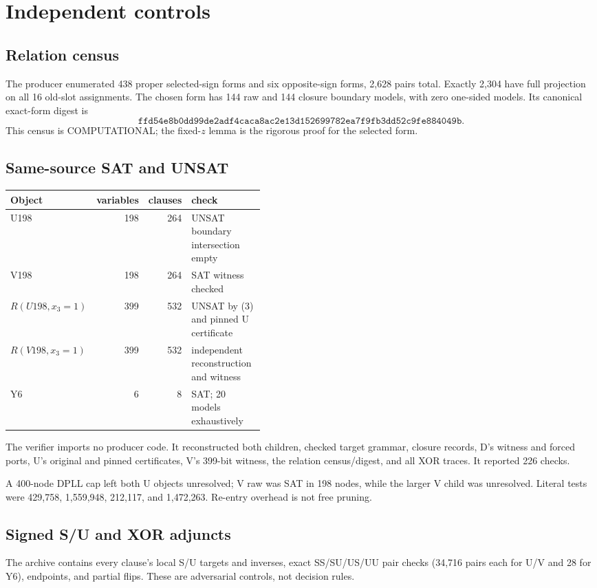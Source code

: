 \documentclass[11pt]{article}
\newcommand{\status}[1]{\textsf{#1}}
\begin{document}
\section{Independent controls}

\subsection{Relation census}
The producer enumerated 438 proper selected-sign forms and six opposite-sign forms, 2,628 pairs total.  Exactly 2,304 have full projection on all 16 old-slot assignments.  The chosen form has 144 raw and 144 closure boundary models, with zero one-sided models.  Its canonical exact-form digest is
\[
\texttt{ffd54e8b0dd99de2adf4caca8ac2e13d152699782ea7f9fb3dd52c9fe884049b}.
\]
This census is \status{COMPUTATIONAL}; the fixed-$z$ lemma is the rigorous proof for the selected form.

\subsection{Same-source SAT and UNSAT}
\begin{center}
\begin{tabular}{lrrp{0.43\linewidth}}
\toprule
Object & variables & clauses & check\\
\midrule
U198 & 198 & 264 & UNSAT boundary intersection empty\\
V198 & 198 & 264 & SAT witness checked\\
$R(U198,x_3=1)$ & 399 & 532 & UNSAT by (3) and pinned U certificate\\
$R(V198,x_3=1)$ & 399 & 532 & independent reconstruction and witness\\
Y6 & 6 & 8 & SAT; 20 models exhaustively\\
\bottomrule
\end{tabular}
\end{center}
The verifier imports no producer code.  It reconstructed both children, checked target grammar, closure records, D's witness and forced ports, U's original and pinned certificates, V's 399-bit witness, the relation census/digest, and all XOR traces.  It reported 226 checks.

A 400-node DPLL cap left both U objects unresolved; V raw was SAT in 198 nodes, while the larger V child was unresolved.  Literal tests were 429,758, 1,559,948, 212,117, and 1,472,263.  Re-entry overhead is not free pruning.

\subsection{Signed S/U and XOR adjuncts}
The archive contains every clause's local S/U targets and inverses, exact SS/SU/US/UU pair checks (34,716 pairs each for U/V and 28 for Y6), endpoints, and partial flips.  These are adversarial controls, not decision rules.
\end{document}
